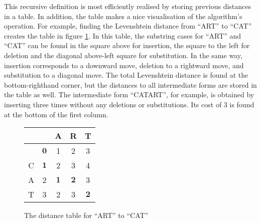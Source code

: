 \documentclass[11pt]{article}
\begin{document}


This recursive definition is most efficiently realised by storing
previous distances in a table. In addition, the table makes a nice
visualisation of the algorithm's operation.  For example, finding the
Levenshtein distance from ``ART'' to ``CAT'' creates the table in
figure \ref{art2cattable}. In this table, the substring cases for
``ART'' and ``CAT'' can be found in the square above for insertion,
the square to the left for deletion and the diagonal above-left square
for substitution.  In the same way, insertion corresponds to a downward
move, deletion to a rightward move, and substitution to a diagonal
move. The total Levenshtein distance is found at the bottom-righthand
corner, but the distances to all intermediate forms are stored in the
table as well. The intermediate form ``CATART'', for example, is
obtained by inserting three times without any deletions or
substitutions. Its cost of 3 is found at the bottom of the first
column.

\begin{figure}
\caption{The distance table for ``ART'' to ``CAT''}

\begin{center}
\begin{tabular}{c|c|c|c|c}
  &   & A & R & T \\
\hline
  & $\mathbf{0}$ & 1 & 2 & 3 \\
\hline
C & $\mathbf{1}$ & 2 & 3 & 4 \\
\hline
A & 2 & $\mathbf{1}$ & $\mathbf{2}$ & 3 \\
\hline
T & 3 & 2 & 3 & $\mathbf{2}$
\end{tabular}

\end{center}

\label{art2cattable}
\end{figure}
\end{document}
